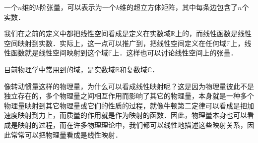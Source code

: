 一个$n$维的$k$阶张量，可以表示为一个$k$维的超立方体矩阵，其中每条边包含了$n$个实数．

我们在之前的定义中都把线性空间看成是定义在实数域$\mathbb{R}$上的，而线性函数是线性空间映射到实数．实际上，这一点可以推广到，把线性空间定义在任何域$\mathbb{F}$上，线性函数就是线性空间映射到这个域$\mathbb{F}$上．这样也可以讨论线性空间上的张量．

目前物理学中常用到的域，是实数域$\mathbb{R}$和复数域$\mathbb{C}$．

像转动惯量这样的物理量，为什么可以看成线性映射呢？这是因为物理量彼此不是独立存在的，多个物理量之间相互作用而影响了其它的物理量，本身就是一种多个物理量映射到其它物理量或它们的性质的过程，就像牛顿第二定律可以看成是把加速度映射到力上，而质量的作用就是作为映射的函数．因此，物理量本身也可以看成是映射的过程，而在许多物理理论中，我们都可以线性地描述这些映射关系，因此常常可以把物理量看成是线性映射．
